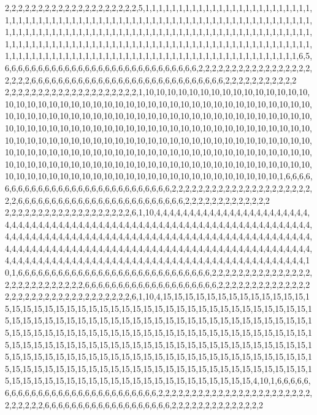 2,2,2,2,2,2,2,2,2,2,2,2,2,2,2,2,2,2,2,2,5,1,1,1,1,1,1,1,1,1,1,1,1,1,1,1,1,1,1,1,1,1,1,1,1,1,1,1,1,1,1,1,1,1,1,1,1,1,1,1,1,1,1,1,1,1,1,1,1,1,1,1,1,1,1,1,1,1,1,1,1,1,1,1,1,1,1,1,1,1,1,1,1,1,1,1,1,1,1,1,1,1,1,1,1,1,1,1,1,1,1,1,1,1,1,1,1,1,1,1,1,1,1,1,1,1,1,1,1,1,1,1,1,1,1,1,1,1,1,1,1,1,1,1,1,1,1,1,1,1,1,1,1,1,1,1,1,1,1,1,1,1,1,1,1,1,1,1,1,1,1,1,1,1,1,1,1,1,1,1,1,1,1,1,1,1,1,1,1,1,1,1,1,1,1,1,1,1,1,1,1,1,1,1,1,1,1,1,1,1,1,1,1,1,1,1,1,1,1,1,1,1,1,1,1,1,1,1,6,5,6,6,6,6,6,6,6,6,6,6,6,6,6,6,6,6,6,6,6,6,6,6,6,6,6,6,6,6,6,2,2,2,2,2,2,2,2,2,2,2,2,2,2,2,2,2,2,2,2,2,6,6,6,6,6,6,6,6,6,6,6,6,6,6,6,6,6,6,6,6,6,6,6,6,6,6,6,6,6,2,2,2,2,2,2,2,2,2,2,2
2,2,2,2,2,2,2,2,2,2,2,2,2,2,2,2,2,2,2,2,1,10,10,10,10,10,10,10,10,10,10,10,10,10,10,10,10,10,10,10,10,10,10,10,10,10,10,10,10,10,10,10,10,10,10,10,10,10,10,10,10,10,10,10,10,10,10,10,10,10,10,10,10,10,10,10,10,10,10,10,10,10,10,10,10,10,10,10,10,10,10,10,10,10,10,10,10,10,10,10,10,10,10,10,10,10,10,10,10,10,10,10,10,10,10,10,10,10,10,10,10,10,10,10,10,10,10,10,10,10,10,10,10,10,10,10,10,10,10,10,10,10,10,10,10,10,10,10,10,10,10,10,10,10,10,10,10,10,10,10,10,10,10,10,10,10,10,10,10,10,10,10,10,10,10,10,10,10,10,10,10,10,10,10,10,10,10,10,10,10,10,10,10,10,10,10,10,10,10,10,10,10,10,10,10,10,10,10,10,10,10,10,10,10,10,10,10,10,10,10,10,10,10,10,10,10,10,10,10,1,6,6,6,6,6,6,6,6,6,6,6,6,6,6,6,6,6,6,6,6,6,6,6,6,6,6,6,6,6,2,2,2,2,2,2,2,2,2,2,2,2,2,2,2,2,2,2,2,2,2,2,2,6,6,6,6,6,6,6,6,6,6,6,6,6,6,6,6,6,6,6,6,6,6,6,6,6,2,2,2,2,2,2,2,2,2,2,2,2,2
2,2,2,2,2,2,2,2,2,2,2,2,2,2,2,2,2,2,2,6,1,10,4,4,4,4,4,4,4,4,4,4,4,4,4,4,4,4,4,4,4,4,4,4,4,4,4,4,4,4,4,4,4,4,4,4,4,4,4,4,4,4,4,4,4,4,4,4,4,4,4,4,4,4,4,4,4,4,4,4,4,4,4,4,4,4,4,4,4,4,4,4,4,4,4,4,4,4,4,4,4,4,4,4,4,4,4,4,4,4,4,4,4,4,4,4,4,4,4,4,4,4,4,4,4,4,4,4,4,4,4,4,4,4,4,4,4,4,4,4,4,4,4,4,4,4,4,4,4,4,4,4,4,4,4,4,4,4,4,4,4,4,4,4,4,4,4,4,4,4,4,4,4,4,4,4,4,4,4,4,4,4,4,4,4,4,4,4,4,4,4,4,4,4,4,4,4,4,4,4,4,4,4,4,4,4,4,4,4,4,4,4,4,4,4,4,4,4,4,4,4,4,4,4,4,4,4,4,10,1,6,6,6,6,6,6,6,6,6,6,6,6,6,6,6,6,6,6,6,6,6,6,6,6,6,6,6,6,6,2,2,2,2,2,2,2,2,2,2,2,2,2,2,2,2,2,2,2,2,2,2,2,2,2,2,2,6,6,6,6,6,6,6,6,6,6,6,6,6,6,6,6,6,6,6,6,2,2,2,2,2,2,2,2,2,2,2,2,2,2
2,2,2,2,2,2,2,2,2,2,2,2,2,2,2,2,2,2,2,6,1,10,4,15,15,15,15,15,15,15,15,15,15,15,15,15,15,15,15,15,15,15,15,15,15,15,15,15,15,15,15,15,15,15,15,15,15,15,15,15,15,15,15,15,15,15,15,15,15,15,15,15,15,15,15,15,15,15,15,15,15,15,15,15,15,15,15,15,15,15,15,15,15,15,15,15,15,15,15,15,15,15,15,15,15,15,15,15,15,15,15,15,15,15,15,15,15,15,15,15,15,15,15,15,15,15,15,15,15,15,15,15,15,15,15,15,15,15,15,15,15,15,15,15,15,15,15,15,15,15,15,15,15,15,15,15,15,15,15,15,15,15,15,15,15,15,15,15,15,15,15,15,15,15,15,15,15,15,15,15,15,15,15,15,15,15,15,15,15,15,15,15,15,15,15,15,15,15,15,15,15,15,15,15,15,15,15,15,15,15,15,15,15,15,15,15,15,15,15,15,15,15,15,15,15,15,15,4,10,1,6,6,6,6,6,6,6,6,6,6,6,6,6,6,6,6,6,6,6,6,6,6,6,6,6,6,6,6,2,2,2,2,2,2,2,2,2,2,2,2,2,2,2,2,2,2,2,2,2,2,2,2,2,2,2,2,2,6,6,6,6,6,6,6,6,6,6,6,6,6,6,6,6,6,6,6,2,2,2,2,2,2,2,2,2,2,2,2,2,2

